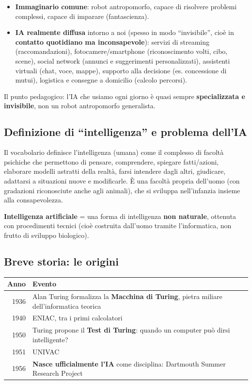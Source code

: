 \documentclass[11pt,a4paper]{report}
\begin{document}
\begin{itemize}
  \item \textbf{Immaginario comune}: robot antropomorfo, capace di risolvere problemi complessi, capace di imparare (fantascienza).
  \item \textbf{IA realmente diffusa} intorno a noi (spesso in modo ``invisibile'', cioè in \textbf{contatto quotidiano ma inconsapevole}): servizi di streaming (raccomandazioni), fotocamere/smartphone (riconoscimento volti, cibo, scene), social network (annunci e suggerimenti personalizzati), assistenti virtuali (chat, voce, mappe), supporto alla decisione (es. concessione di mutui), logistica e consegne a domicilio (calcolo percorsi).
\end{itemize}

Il punto pedagogico: l'IA che usiamo ogni giorno è quasi sempre \textbf{specializzata e invisibile}, non un robot antropomorfo generalista.

\subsection{Definizione di ``intelligenza'' e problema dell'IA}

Il vocabolario definisce l'intelligenza (umana) come il complesso di facoltà psichiche che permettono di pensare, comprendere, spiegare fatti/azioni, elaborare modelli astratti della realtà, farsi intendere dagli altri, giudicare, adattarsi a situazioni nuove e modificarle. È una facoltà propria dell'uomo (con gradazioni riconosciute anche agli animali), che si sviluppa nell'infanzia insieme alla consapevolezza.

\textbf{Intelligenza artificiale} = una forma di intelligenza \textbf{non naturale}, ottenuta con procedimenti tecnici (cioè costruita dall'uomo tramite l'informatica, non frutto di sviluppo biologico).

\subsection{Breve storia: le origini}

\begin{center}
\begin{tabular}{@{}rl@{}}
\toprule
\textbf{Anno} & \textbf{Evento} \\
\midrule
1936 & Alan Turing formalizza la \textbf{Macchina di Turing}, pietra miliare dell'informatica teorica \\
1940 & ENIAC, tra i primi calcolatori \\
1950 & Turing propone il \textbf{Test di Turing}: quando un computer può dirsi intelligente? \\
1951 & UNIVAC \\
1956 & \textbf{Nasce ufficialmente l'IA} come disciplina: Dartmouth Summer Research Project \\
\bottomrule
\end{tabular}
\end{center}
\end{document}
